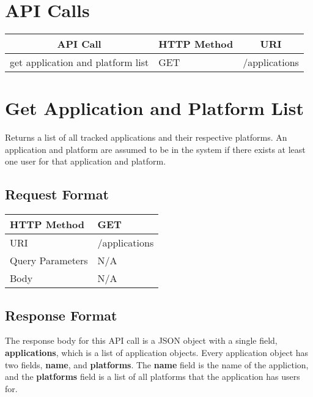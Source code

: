 
\section{API Calls}
\begin{center}
\begin{tabular}{|l||l||l|}
\hline

\multicolumn{1}{|c||}{\textbf{API Call}} &
\multicolumn{1}{c||}{\textbf{HTTP Method}} &
\multicolumn{1}{c|}{\textbf{URI}} \\

\hline
\hline
get application and platform list  & GET & /applications \\
\hline
\end{tabular}
\end{center}

\section{Get Application and Platform List}

Returns a list of all tracked applications and their respective platforms.
An application and platform are assumed to be in the system if there exists
at least one user for that application and platform.

\subsection{Request Format}
\begin{center}
\begin{tabular}{|l||l|}
\hline
HTTP Method & GET           \\
\hline
URI         & /applications \\
\hline
Query Parameters & N/A           \\
\hline
Body        & N/A           \\
\hline
\end{tabular}
\end{center}


\subsection{Response Format}

The response body for this API call is a JSON object with a single field, \textbf{applications},
which is a list of application objects. Every application object has two fields, \textbf{name},
and \textbf{platforms}. The \textbf{name} field is the name of the appliction, and the
\textbf{platforms} field is a list of all platforms that the application has users for.

